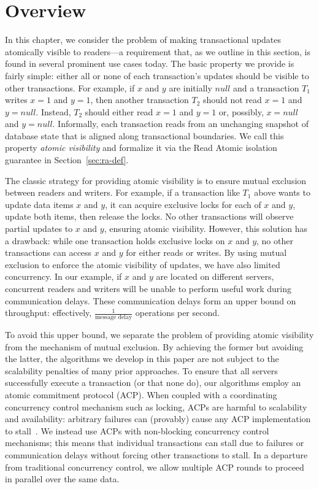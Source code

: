 
\section{Overview}
\label{sec:ramp-motivation}

In this chapter, we consider the problem of making transactional
updates atomically visible to readers---a requirement that, as we
outline in this section, is found in several prominent use cases
today. The basic property we provide is fairly simple: either all or
none of each transaction's updates should be visible to other
transactions. For example, if $x$ and $y$ are initially $null$ and a
transaction $T_1$ writes $x = 1$ and $y = 1$, then another transaction
$T_2$ should not read $x=1$ and $y=null$. Instead, $T_2$ should either
read $x=1$ and $y=1$ or, possibly, $x=null$ and $y=null$. Informally,
each transaction reads from an unchanging snapshot of database state
that is aligned along transactional boundaries. We call this property
\textit{atomic visibility} and formalize it via the Read Atomic
isolation guarantee in Section~\ref{sec:ra-def}.

The classic strategy for providing atomic visibility is to ensure
mutual exclusion between readers and writers. For example, if a
transaction like $T_1$ above wants to update data items $x$ and $y$,
it can acquire exclusive locks for each of $x$ and $y$, update both
items, then release the locks. No other transactions will observe
partial updates to $x$ and $y$, ensuring atomic visibility. However,
this solution has a drawback: while one transaction holds exclusive
locks on $x$ and $y$, no other transactions can access $x$ and $y$ for
either reads or writes. By using mutual exclusion to enforce the
atomic visibility of updates, we have also limited concurrency. In our
example, if $x$ and $y$ are located on different servers, concurrent
readers and writers will be unable to perform useful work during
communication delays. These communication delays form an upper bound
on throughput: effectively, $\frac{1}{\textrm{message delay}}$
operations per second.

To avoid this upper bound, we separate the problem of providing atomic
visibility from the mechanism of mutual exclusion. By achieving the
former but avoiding the latter, the algorithms we develop in this
paper are not subject to the scalability penalties of many prior
approaches. To ensure that all servers successfully execute a
transaction (or that none do), our algorithms employ an atomic
commitment protocol (ACP). When coupled with a coordinating concurrency
control mechanism such as locking, ACPs are harmful to scalability and
availability: arbitrary failures can (provably) cause any ACP
implementation to stall~\cite{bernstein-book}. We instead use ACPs
with non-blocking concurrency control mechanisms; this means that
individual transactions can stall due to failures or communication
delays without forcing other transactions to stall. In a departure
from traditional concurrency control, we allow multiple ACP rounds to
proceed in parallel over the same data.

